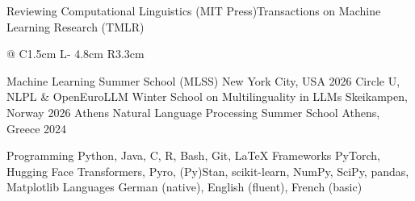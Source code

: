 \documentclass[11pt, a4paper]{awesome-cv}
\makeatletter
\let\acvOrigSection\cvsection
\renewcommand{\cvsection}[1]{\Needspace*{4cm}\acvOrigSection{#1}}
\renewenvironment{cvhonors}{%
  \vspace{\acvSectionContentTopSkip}
  \vspace{-2mm}
  \begin{center}
    \setlength\tabcolsep{0pt}
    \setlength{\extrarowheight}{0pt}
    \begin{tabular*}{\textwidth}{@{\extracolsep{\fill}} C{1.5cm} L{\textwidth - 4.8cm} R{3.3cm}}
}{%
    \end{tabular*}
  \end{center}
}
\makeatother
\begin{document}
\begin{cvskills}
  \cvskill
    {Reviewing}
    {Computational Linguistics (MIT Press){\enskip\cdotp\enskip}Transactions on Machine Learning Research (TMLR)}
\end{cvskills}

\begin{cvhonors}
  \cvhonor
    {Machine Learning Summer School (MLSS)}
    {}
    {New York City, USA}
    {2026}
  \cvhonor
    {Circle U, NLPL \& OpenEuroLLM Winter School on Multilinguality in LLMs}
    {}
    {Skeikampen, Norway}
    {2026}
  \cvhonor
    {Athens Natural Language Processing Summer School}
    {}
    {Athens, Greece}
    {2024}
\end{cvhonors}

\begin{cvskills}
  \cvskill
    {Programming}
    {Python, Java, C, R, Bash, Git, \LaTeX}
  \cvskill
    {Frameworks}
    {PyTorch, Hugging Face Transformers, Pyro, (Py)Stan, scikit-learn, NumPy, SciPy, pandas, Matplotlib}
  \cvskill
    {Languages}
    {German (native), English (fluent), French (basic)}
\end{cvskills}
\end{document}
